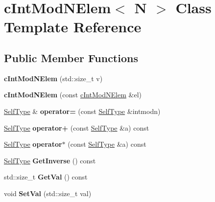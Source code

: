 \hypertarget{classcIntModNElem}{
\section{c\-Int\-Mod\-N\-Elem$<$ \-N $>$ \-Class \-Template \-Reference}
\label{classcIntModNElem}
}
\subsection*{\-Public \-Member \-Functions}
\begin{DoxyCompactItemize}
\item 
\hypertarget{classcIntModNElem_a93be93aa382c5501b0f36322b24e93db}{
{\bfseries c\-Int\-Mod\-N\-Elem} (std\-::size\-\_\-t v)}
\label{classcIntModNElem_a93be93aa382c5501b0f36322b24e93db}

\item 
\hypertarget{classcIntModNElem_a878192260976d100695404d0bbc28484}{
{\bfseries c\-Int\-Mod\-N\-Elem} (const \hyperlink{classcIntModNElem}{c\-Int\-Mod\-N\-Elem} \&el)}
\label{classcIntModNElem_a878192260976d100695404d0bbc28484}

\item 
\hypertarget{classcIntModNElem_a0d0ae718c816556da6fcbf19454c676d}{
\hyperlink{classcIntModNElem}{\-Self\-Type} \& {\bfseries operator=} (const \hyperlink{classcIntModNElem}{\-Self\-Type} \&intmodn)}
\label{classcIntModNElem_a0d0ae718c816556da6fcbf19454c676d}

\item 
\hypertarget{classcIntModNElem_a10093e22457346b333e45f1414739497}{
\hyperlink{classcIntModNElem}{\-Self\-Type} {\bfseries operator+} (const \hyperlink{classcIntModNElem}{\-Self\-Type} \&a) const }
\label{classcIntModNElem_a10093e22457346b333e45f1414739497}

\item 
\hypertarget{classcIntModNElem_adff6836b0b7a20c50b6b9696aea66ca6}{
\hyperlink{classcIntModNElem}{\-Self\-Type} {\bfseries operator$\ast$} (const \hyperlink{classcIntModNElem}{\-Self\-Type} \&a) const }
\label{classcIntModNElem_adff6836b0b7a20c50b6b9696aea66ca6}

\item 
\hypertarget{classcIntModNElem_a641e400e55b454c2832262eabc8442b6}{
\hyperlink{classcIntModNElem}{\-Self\-Type} {\bfseries \-Get\-Inverse} () const }
\label{classcIntModNElem_a641e400e55b454c2832262eabc8442b6}

\item 
\hypertarget{classcIntModNElem_ad584ee8c4e7e57a16963e6cb5cd73c6d}{
std\-::size\-\_\-t {\bfseries \-Get\-Val} () const }
\label{classcIntModNElem_ad584ee8c4e7e57a16963e6cb5cd73c6d}

\item 
\hypertarget{classcIntModNElem_ac5d61d5866718ab5062d5030ac44b49e}{
void {\bfseries \-Set\-Val} (std\-::size\-\_\-t val)}
\label{classcIntModNElem_ac5d61d5866718ab5062d5030ac44b49e}

\end{DoxyCompactItemize}
